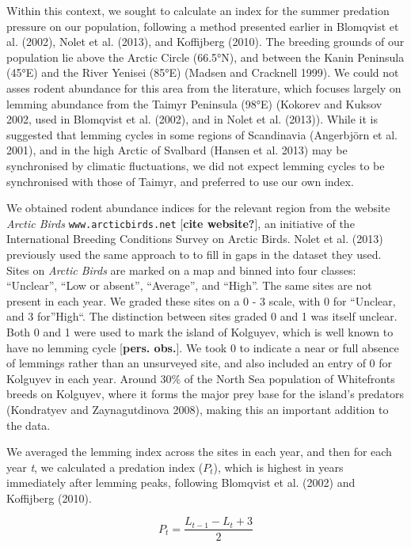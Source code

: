 \documentclass[twocolumn]{article}
\begin{document}
Within this context, we sought to calculate an index for the summer
predation pressure on our population, following a method presented
earlier in Blomqvist et al. (2002), Nolet et al. (2013), and Koffijberg
(2010). The breeding grounds of our population lie above the Arctic
Circle (66.5°N), and between the Kanin Peninsula (45°E) and the River
Yenisei (85°E) (Madsen and Cracknell 1999). We could not asses rodent
abundance for this area from the literature, which focuses largely on
lemming abundance from the Taimyr Peninsula (98°E) (Kokorev and Kuksov
2002, used in Blomqvist et al. (2002), and in Nolet et al. (2013)).
While it is suggested that lemming cycles in some regions of Scandinavia
(Angerbjörn et al. 2001), and in the high Arctic of Svalbard (Hansen et
al. 2013) may be synchronised by climatic fluctuations, we did not
expect lemming cycles to be synchronised with those of Taimyr, and
preferred to use our own index.

We obtained rodent abundance indices for the relevant region from the
website \emph{Arctic Birds} \texttt{www.arcticbirds.net} {[}\textbf{cite
website?}{]}, an initiative of the International Breeding Conditions
Survey on Arctic Birds. Nolet et al. (2013) previously used the same
approach to to fill in gaps in the dataset they used. Sites on
\emph{Arctic Birds} are marked on a map and binned into four classes:
``Unclear'', ``Low or absent'', ``Average'', and ``High''. The same
sites are not present in each year. We graded these sites on a 0 - 3
scale, with 0 for ``Unclear, and 3 for''High``. The distinction between
sites graded 0 and 1 was itself unclear. Both 0 and 1 were used to mark
the island of Kolguyev, which is well known to have no lemming cycle
{[}\textbf{pers. obs.}{]}. We took 0 to indicate a near or full absence
of lemmings rather than an unsurveyed site, and also included an entry
of 0 for Kolguyev in each year. Around 30\% of the North Sea population
of Whitefronts breeds on Kolguyev, where it forms the major prey base
for the island's predators (Kondratyev and Zaynagutdinova 2008), making
this an important addition to the data.

We averaged the lemming index across the sites in each year, and then
for each year \emph{t}, we calculated a predation index (\(P_t\)), which
is highest in years immediately after lemming peaks, following Blomqvist
et al. (2002) and Koffijberg (2010).

\begin{equation} P_t = \frac{L_{t-1} - L_t + 3}{2} \end{equation}
\end{document}

